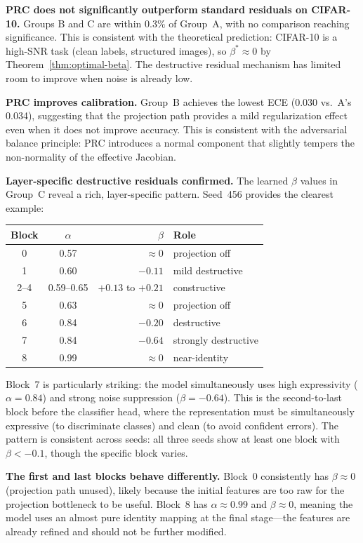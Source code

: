 \documentclass[11pt,a4paper]{article}
\theoremstyle{definition}
\begin{document}
\textbf{PRC does not significantly outperform standard residuals on CIFAR-10.}
Groups B and C are within $0.3\%$ of Group~A, with no comparison reaching
significance. This is consistent with the theoretical prediction:
CIFAR-10 is a high-SNR task (clean labels, structured images), so
$\beta^* \approx 0$ by Theorem~\ref{thm:optimal-beta}. The
destructive residual mechanism has limited room to improve when
noise is already low.

\textbf{PRC improves calibration.}
Group~B achieves the lowest ECE (0.030 vs.\ A's 0.034), suggesting
that the projection path provides a mild regularization effect even
when it does not improve accuracy. This is consistent with the
adversarial balance principle: PRC introduces a normal component
that slightly tempers the non-normality of the effective Jacobian.

\textbf{Layer-specific destructive residuals confirmed.}
The learned $\beta$ values in Group~C reveal a rich, layer-specific
pattern. Seed~456 provides the clearest example:

\begin{center}
\begin{tabular}{ccrl}
Block & $\alpha$ & $\beta$ & Role \\
\midrule
0     & 0.57 & $\approx 0$    & projection off \\
1     & 0.60 & $-0.11$ & mild destructive \\
2--4  & 0.59--0.65 & $+0.13$ to $+0.21$ & constructive \\
5     & 0.63 & $\approx 0$    & projection off \\
6     & 0.84 & $-0.20$ & destructive \\
7     & 0.84 & $\mathbf{-0.64}$ & strongly destructive \\
8     & 0.99 & $\approx 0$    & near-identity \\
\end{tabular}
\end{center}

Block~7 is particularly striking: the model simultaneously uses
high expressivity ($\alpha = 0.84$) and strong noise suppression
($\beta = -0.64$). This is the second-to-last block before the
classifier head, where the representation must be simultaneously
expressive (to discriminate classes) and clean (to avoid confident
errors). The pattern is consistent across seeds: all three seeds
show at least one block with $\beta < -0.1$, though the specific
block varies.

\textbf{The first and last blocks behave differently.}
Block~0 consistently has $\beta \approx 0$ (projection path unused),
likely because the initial features are too raw for the projection
bottleneck to be useful. Block~8 has $\alpha \approx 0.99$ and
$\beta \approx 0$, meaning the model uses an almost pure identity
mapping at the final stage---the features are already refined and
should not be further modified.
\end{document}
